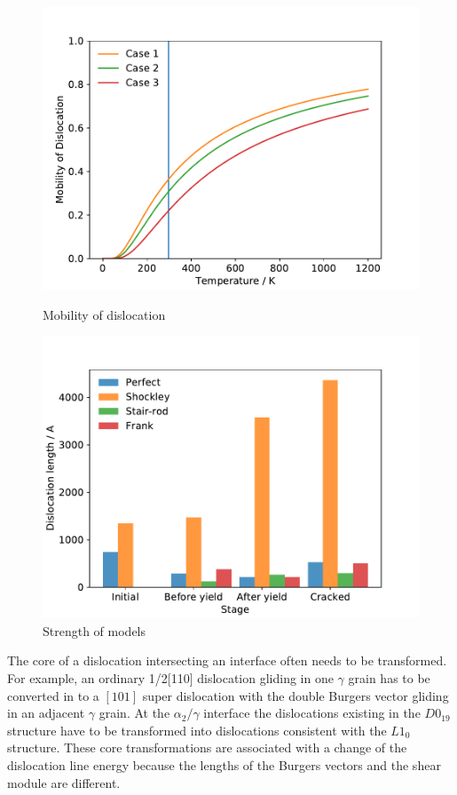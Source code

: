 \documentclass[metals,article,submit,moreauthors,pdftex,10pt,a4paper]{Definitions/mdpi}
\begin{document}
\begin{figure}[ht]
	\centering
	\begin{minipage}{0.495\textwidth}
		\includegraphics[width=1\linewidth]{img/temp}
		\centering
		\caption{Mobility of dislocation\\
		}
		\label{fig:temp}
	\end{minipage}	
	\hfill
	\begin{minipage}{0.495\textwidth}		
		\includegraphics[width=1\linewidth]{img/disum}
		\centering
		\caption{Strength of models}
		\label{fig:disum}
	\end{minipage}
\end{figure}

	
The core of a dislocation intersecting an interface often needs to be transformed. For example, an ordinary 1/2[110] dislocation gliding in one $\gamma$ grain has to be converted in to a $[101]$ super dislocation with the double Burgers vector gliding in an adjacent $\gamma$ grain. At the $\alpha_2/\gamma$ interface the dislocations existing in the $D0_{19}$ structure have to be transformed into dislocations consistent with the $L1_0$structure. These core transformations are associated with a change of the dislocation line energy because the lengths of the Burgers vectors and the shear module are different.
\end{document}
